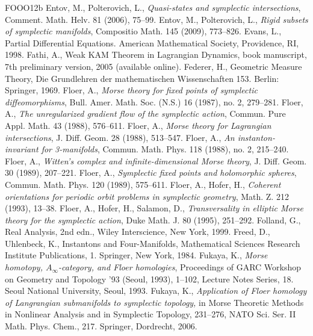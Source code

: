 \begin{thebibliography}{FOOO12b}
 Entov, M., Polterovich, L., \textit{Quasi-states and symplectic intersections}, Comment. Math. Helv. 81 (2006), 75--99.
 Entov, M., Polterovich, L., \textit{Rigid subsets of symplectic manifolds}, Compositio Math. 145 (2009), 773--826.
 Evans, L., Partial Differential Equations. American Mathematical Society, Providence, RI, 1998.
 Fathi, A., Weak KAM Theorem in Lagrangian Dynamics, book manuscript, 7th preliminary version, 2005 (available online).
 Federer, H., Geometric Measure Theory, Die Grundlehren der mathematischen Wissenschaften 153. Berlin: Springer, 1969.
 Floer, A., \textit{Morse theory for fixed points of symplectic diffeomorphisms}, Bull. Amer. Math. Soc. (N.S.) 16 (1987), no. 2, 279--281.
 Floer, A., \textit{The unregularized gradient flow of the symplectic action}, Commun. Pure Appl. Math. 43 (1988), 576--611.
 Floer, A., \textit{Morse theory for Lagrangian intersections}, J. Diff. Geom. 28 (1988), 513--547.
 Floer, A., \textit{An instanton-invariant for 3-manifolds}, Commun. Math. Phys. 118 (1988), no. 2, 215--240.
 Floer, A., \textit{Witten\textquoteright{}s complex and infinite-dimensional Morse theory}, J. Diff. Geom. 30 (1989), 207--221.
 Floer, A., \textit{Symplectic fixed points and holomorphic spheres}, Commun. Math. Phys. 120 (1989), 575--611.
 Floer, A., Hofer, H., \textit{Coherent orientations for periodic orbit problems in symplectic geometry}, Math. Z. 212 (1993), 13--38.
 Floer, A., Hofer, H., Salamon, D., \textit{Transversality in elliptic Morse theory for the symplectic action}, Duke Math. J. 80 (1995), 251--292.
 Folland, G., Real Analysis, 2nd edn., Wiley Interscience, New York, 1999.
 Freed, D., Uhlenbeck, K., Instantons and Four-Manifolds, Mathematical Sciences Research Institute Publications, 1. Springer, New York, 1984.
 Fukaya, K., \textit{Morse homotopy, $A_\infty$-category, and Floer homologies}, Proceedings of GARC Workshop on Geometry and Topology \textquoteright{}93 (Seoul, 1993), 1--102, Lecture Notes Series, 18. Seoul National University, Seoul, 1993.
 Fukaya, K., \textit{Application of Floer homology of Langrangian submanifolds to symplectic topology,} in Morse Theoretic Methods in Nonlinear Analysis and in Symplectic Topology, 231--276, NATO Sci. Ser. II Math. Phys. Chem., 217. Springer, Dordrecht, 2006.

\end{thebibliography}

